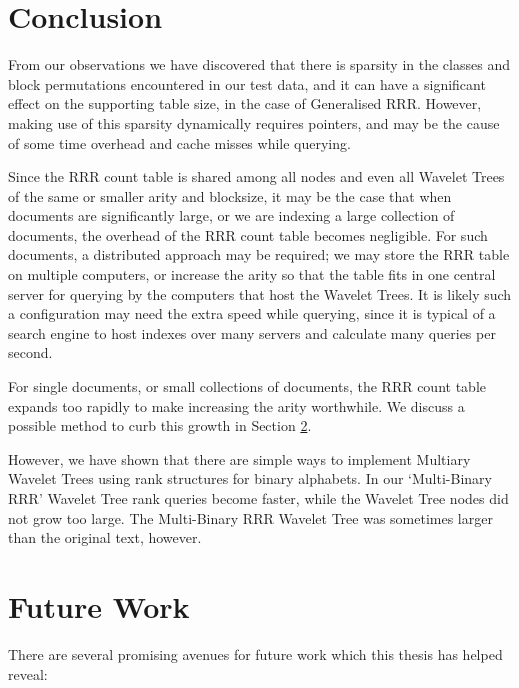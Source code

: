 \section{Conclusion}
\label{sec:conclusion}

From our observations we have discovered that there is sparsity in the classes 
and block permutations encountered in our test data, and it 
can have a significant effect on the supporting table size, in
the case of Generalised RRR. However, making use of this sparsity dynamically
requires pointers, and may be the cause of some time overhead and cache misses 
while querying.

Since the RRR count table is shared among all nodes and even all Wavelet Trees
of the same or smaller arity and blocksize, it may be the case that when 
documents are significantly large, or we are indexing a large collection of 
documents, the overhead of the RRR count table becomes negligible. For such 
documents, a distributed approach may be required; we may store the RRR table on
multiple computers, or increase the arity so that the table fits in one central
server for querying by the computers that host the Wavelet Trees. It is likely 
such a configuration may need the extra speed while querying, since it is 
typical of a search engine to host indexes over many servers and 
calculate many queries per second.

For single documents, or small collections of documents, the RRR count table 
expands too rapidly to make increasing the arity worthwhile. We discuss a 
possible method to curb this growth in Section \ref{sec:future}.

However, we have shown that there are simple 
ways to implement Multiary Wavelet Trees using rank structures for binary 
alphabets. In our `Multi-Binary RRR' Wavelet Tree rank 
queries become faster, while the Wavelet Tree nodes did not grow too large. The
Multi-Binary RRR Wavelet Tree was sometimes larger than the original text, 
however.

\section{Future Work}
\label{sec:future}
There are several promising avenues for future work which this thesis has helped
reveal:

